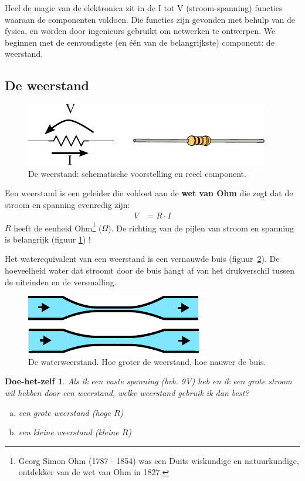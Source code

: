 \documentclass{article}
\newtheorem{DIY}{Doe-het-zelf}
\begin{document}
		Heel de magie van de elektronica zit in de I tot V (stroom-spanning) functies waaraan de componenten voldoen. Die functies zijn gevonden met behulp van de fysica, en worden door ingenieurs gebruikt om netwerken te ontwerpen. We beginnen met de eenvoudigste (en \'e\'en van de belangrijkste) component: de weerstand.

		\subsection{De weerstand}
			\begin{figure}[htbp]
				\centering
				\includegraphics{weerstand}
				\caption{De weerstand: schematische voorstelling en re\"eel component.}
				\label{fig:weerstand}
			\end{figure}
			 Een weerstand is een geleider die voldoet aan de \textbf{wet van Ohm} die zegt dat de stroom en spanning evenredig zijn: 
			\begin{align}
				V &= R \cdot I
			\end{align} 
			$R$ heeft de eenheid Ohm\footnote{Georg Simon Ohm (1787 - 1854) was een Duits wiskundige en natuurkundige, ontdekker van de wet van Ohm in 1827.} ($\Omega$). De richting van de pijlen van stroom en spanning is belangrijk (figuur \ref{fig:weerstand}) !

			Het waterequivalent van een weerstand is een vernauwde buis (figuur~\ref{fig:waterweerstand}). De hoeveelheid water dat stroomt door de buis hangt af van het drukverschil tussen de uiteinden en de versmalling.

			\begin{figure}[htbp]
				\centering
				\includegraphics{waterweerstand}
				\caption{De waterweerstand. Hoe groter de weerstand, hoe nauwer de buis.}
				\label{fig:waterweerstand}
			\end{figure}
				\begin{DIY}
					Als ik een vaste spanning (bvb. 9V) heb en ik een grote stroom wil hebben door een weerstand, welke weerstand gebruik ik dan best?
					\begin{enumerate}[a)]
						\item een grote weerstand (hoge $R$)
						\item een kleine weerstand (kleine $R$)
					\end{enumerate}
				\end{DIY}
\end{document}
